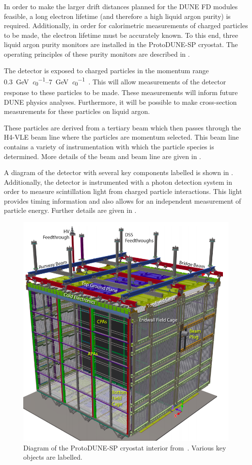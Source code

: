 In order to make the larger drift distances planned for the DUNE FD modules feasible, a long electron lifetime (and therefore a high liquid argon purity) is required.
Additionally, in order for calorimetric measurements of charged particles to be made, the electron lifetime must be accurately known.
To this end, three liquid argon purity monitors are installed in the ProtoDUNE-SP cryostat.
The operating principles of these purity monitors are described in .

The detector is exposed to charged particles in the momentum range \SIrange{0.3}{7}{\GeV\per\clight}~\cite{protodunePerformance}.
This will allow measurements of the detector response to these particles to be made.
These measurements will inform future DUNE physics analyses.
Furthermore, it will be possible to make cross-section measurements for these particles on liquid argon.

These particles are derived from a tertiary beam which then passes through the H4-VLE beam line where the particles are momentum selected.
This beam line contains a variety of instrumentation with which the particle species is determined.
More details of the beam and beam line are given in .

A diagram of the detector with several key components labelled is shown in .
Additionally, the detector is instrumented with a photon detection system in order to measure scintillation light from charged particle interactions. 
This light provides timing information and also allows for an independent measurement of particle energy.
Further details are given in .

\begin{figure}[h]
	\centering
	\includegraphics[width=.6\linewidth]{files/figures/protodune_detector/pdspDiag}
	\caption[Captioned diagram of the ProtoDUNE-SP cryostat interior]{Diagram of the ProtoDUNE-SP cryostat interior from~\cite{protodunePerformance}. Various key objects are labelled.}
	\label{fig:pdspDiag}
\end{figure}

